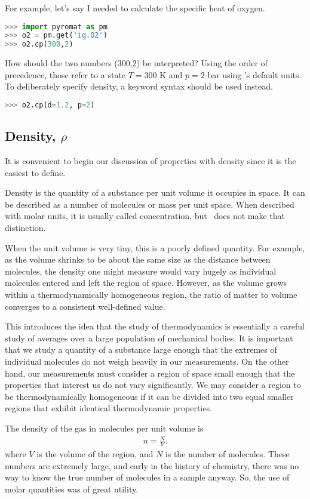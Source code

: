 For example, let's say I needed to calculate the specific heat of oxygen.  

\begin{lstlisting}[language=Python]
>>> import pyromat as pm
>>> o2 = pm.get('ig.O2')
>>> o2.cp(300,2)
\end{lstlisting}

How should the two numbers (300,2) be interpreted?  Using the order of precedence, those refer to a state $T=300$ K and $p=2$ bar using \PM 's default units.  To deliberately specify density, a keyword syntax should be used instead.
\begin{lstlisting}[language=Python]
>>> o2.cp(d=1.2, p=2)
\end{lstlisting}

\subsection{Density, $\rho$}

It is convenient to begin our discussion of properties with density since it is the easiest to define.

Density is the quantity of a substance per unit volume it occupies in space.  It can be described as a number of molecules or mass per unit space.  When described with molar units, it is usually called concentration, but \PM\ does not make that distinction.

When the unit volume is very tiny, this is a poorly defined quantity.  For example, as the volume shrinks to be about the same size as the distance between molecules, the density one might measure would vary hugely as individual molecules entered and left the region of space.  However, as the volume grows within a thermodynamically homogeneous region, the ratio of matter to volume converges to a consistent well-defined value.

This introduces the idea that the study of thermodynamics is essentially a careful study of averages over a large population of mechanical bodies.  It is important that we study a quantity of a substance large enough that the extremes of individual molecules do not weigh heavily in our measurements.  On the other hand, our measurements must consider a region of space small enough that the properties that interest us do not vary significantly.  We may consider a region to be thermodynamically homogeneous if it can be divided into two equal smaller regions that exhibit identical thermodynamic properties.

The density of the gas in molecules per unit volume is
\begin{align}
n = \frac{N}{V}.
\end{align}
where $V$ is the volume of the region, and $N$ is the number of molecules.  These numbers are extremely large, and early in the history of chemistry, there was no way to know the true number of molecules in a sample anyway.  So, the use of molar quantities was of great utility.


